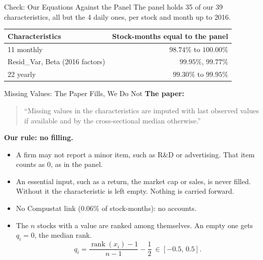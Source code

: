 \documentclass[11pt]{beamer}
\begin{document}
\begin{frame}{Check: Our Equations Against the Panel}
The panel holds 35 of our 39 characteristics, all but the 4 daily ones, per stock and month up to 2016.
\begin{center}
\begin{tabular}{@{}lr@{}}
\toprule
Characteristics & Stock-months equal to the panel\\
\midrule
11 monthly & $98.74\%$ to $100.00\%$\\
Resid\_Var, Beta (2016 factors) & $99.95\%$, $99.77\%$\\
22 yearly & $99.30\%$ to $99.95\%$\\
\bottomrule
\end{tabular}
\end{center}
\end{frame}

\begin{frame}{Missing Values: The Paper Fills, We Do Not}
\textbf{The paper:}
\begin{quote}\small
``Missing values in the characteristics are imputed with last observed values
if available and by the cross-sectional median otherwise.''
\end{quote}
\textbf{Our rule: no filling.}
\begin{itemize}
\item A firm may not report a minor item, such as R\&D or advertising. That item counts as $0$, as in the panel.
\item An essential input, such as a return, the market cap or sales, is never filled.
      Without it the characteristic is left empty. Nothing is carried forward.
\item No Compustat link ($0.06\%$ of stock-months): no accounts.
\item The $n$ stocks with a value are ranked among themselves. An empty one gets $q_i=0$, the median rank.
\[
q_i=\frac{\operatorname{rank}(x_i)-1}{n-1}-\frac12\ \in[-0.5,\,0.5].
\]
\end{itemize}
\end{frame}
\end{document}
